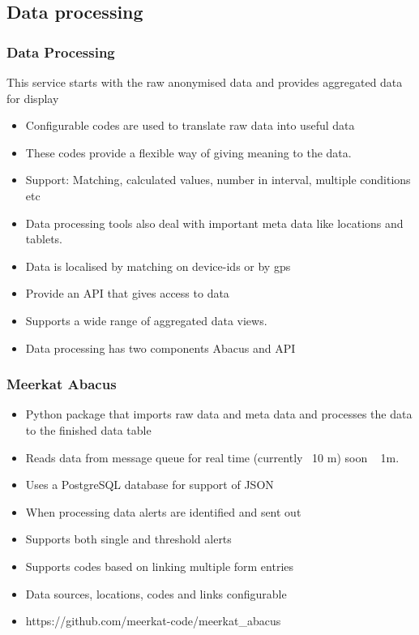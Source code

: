 \documentclass{beamer}
\begin{document}
\subsection{Data processing}
\begin{frame}
  \frametitle{Data Processing}
  This service starts with the raw anonymised data and provides aggregated data for display
  \begin{itemize}
  \item Configurable codes are used to translate raw data into useful data
  \item These codes provide a flexible way of giving meaning to the data.
  \item Support: Matching, calculated values, number in interval, multiple conditions etc
  \item Data processing tools also deal with important meta data like locations and tablets.
  \item Data is localised by matching on device-ids or by gps
  \item Provide an API that gives access to data
  \item Supports a wide range of aggregated data views.
  \item Data processing has two components Abacus and API
  \end{itemize}
\end{frame}



\begin{frame}
  \frametitle{Meerkat Abacus}
  \begin{itemize}
  \item Python package that imports raw data and meta data and processes the data to the finished data table
  \item Reads data from message queue for real time (currently ~10 m) soon ~ 1m. 
  \item Uses a PostgreSQL database for support of JSON 
  \item When processing data alerts are identified and sent out
  \item Supports both single and threshold alerts
  \item Supports codes based on linking multiple form entries
  \item Data sources, locations, codes and links configurable
  \item https://github.com/meerkat-code/meerkat\_abacus
  \end{itemize}

\end{frame}
\end{document}
